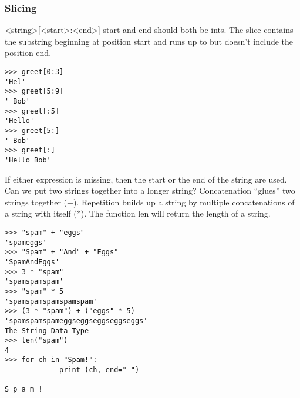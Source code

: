 \documentclass[12pt,a4paper,final,twoside,onecolumn,titlepage]{book}
\begin{document}
\subsubsection{Slicing}
<string>[<start>:<end>]
start and end should both be ints. The slice contains the substring beginning at position start and runs up to but doesn’t include the position end.
\begin{lstlisting}
>>> greet[0:3]
'Hel'
>>> greet[5:9]
' Bob'
>>> greet[:5]
'Hello'
>>> greet[5:]
' Bob'
>>> greet[:]
'Hello Bob'
\end{lstlisting}
If either expression is missing, then the start or the end of the string are used. Can we put two strings together into a longer string? Concatenation “glues” two strings together (+). Repetition builds up a string by multiple concatenations of a string with itself (*). The function len will return the length of a string.
\begin{lstlisting}
>>> "spam" + "eggs"
'spameggs'
>>> "Spam" + "And" + "Eggs"
'SpamAndEggs'
>>> 3 * "spam"
'spamspamspam'
>>> "spam" * 5
'spamspamspamspamspam'
>>> (3 * "spam") + ("eggs" * 5)
'spamspamspameggseggseggseggseggs'
The String Data Type
>>> len("spam")
4
>>> for ch in "Spam!":
	         print (ch, end=" ")
	
S p a m !
\end{lstlisting}
\end{document}
